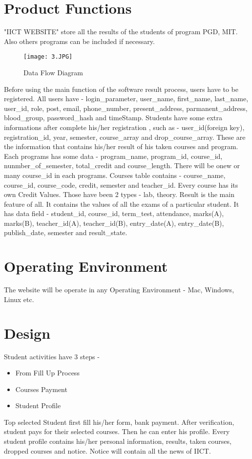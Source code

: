 \documentclass{scrreprt}
\begin{document}
\section{Product Functions}
"IICT WEBSITE" store all the results of the students of program PGD, MIT. Also others programs can be included if necessary.
\begin{figure}[h!]
    \centering
    \texttt{[image: 3.JPG]}
    \caption{Data Flow Diagram}
    \label{fig:Data Flow Diagram}
\end{figure}
Before using the main function of the software result process, users have to be registered. 
\newline
All users have - login\_parameter, user\_name, first\_name, last\_name, user\_id, role, post, email, phone\_number, present\_address, parmanent\_address, blood\_group, password\_hash and timeStamp.
\newline
Students have some extra informations after complete his/her registration , such as - user\_id(foreign key), registration\_id, year, semester, course\_array and drop\_course\_array. These are the information that contains his/her result of his taken courses and program.
\newline
Each programs has some data - program\_name, program\_id, course\_id, nunmber\_of\_semester, total\_credit and course\_length. There will be onew or many course\_id in each programs.
\newline
Courses table contains - course\_name, course\_id, course\_code, credit, semester and teacher\_id.
\newline
Every course has its own Credit Values. Those have been 2 types - lab, theory.
\newline
Result is the main feature of all. It contains the values of all the exams of a particular student. It has data field - student\_id, course\_id, term\_test, attendance, marks(A), marks(B), teacher\_id(A), teacher\_id(B), entry\_date(A), entry\_date(B), publish\_date, semester	and result\_state.

\section{Operating Environment}
The website will be operate in any Operating Environment - Mac, Windows, Linux etc. 

\section{Design}
Student activities have 3 steps -
\begin{itemize}
    \item From Fill Up Process
    \item Courses Payment
    \item Student Profile
\end{itemize}
Top selected Student first fill his/her form, bank payment. After verification, student pays for their selected courses. Then he can enter his profile. 
\newline
Every student profile contains his/her personal information, results, taken courses, dropped courses and notice.
\newline
Notice will contain all the news of IICT.
\end{document}
